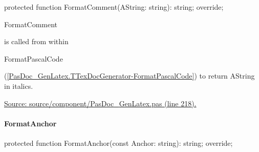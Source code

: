 \documentclass{report}
\newif\ifpdf
\begin{document}
\label{PasDoc_GenLatex.TTexDocGenerator-FormatComment}
\begin{list}{}{
\setlength{\itemindent}{0cm}
\setlength{\listparindent}{0cm}
\setlength{\leftmargin}{\evensidemargin}
\addtolength{\leftmargin}{\tmplength}
\settowidth{\labelsep}{X}
\addtolength{\leftmargin}{\labelsep}
\setlength{\labelwidth}{\tmplength}
}
\item[\textbf{Declaration}\hfill]
\ifpdf
\begin{flushleft}
\fi
\begin{ttfamily}
protected function FormatComment(AString: string): string; override;\end{ttfamily}

\ifpdf
\end{flushleft}
\fi

\par
\item[\textbf{Description}]
\begin{ttfamily}FormatComment\end{ttfamily} is called from within \begin{ttfamily}FormatPascalCode\end{ttfamily}(\ref{PasDoc_GenLatex.TTexDocGenerator-FormatPascalCode}) to return AString in italics.\par
\href{https://github.com/pasdoc/pasdoc/blob/master/source/component/PasDoc_GenLatex.pas#L218}{Source: source/component/PasDoc{\_}GenLatex.pas (line 218).}

\end{list}
\paragraph*{FormatAnchor}\hspace*{\fill}

\label{PasDoc_GenLatex.TTexDocGenerator-FormatAnchor}
\begin{list}{}{
\setlength{\itemindent}{0cm}
\setlength{\listparindent}{0cm}
\setlength{\leftmargin}{\evensidemargin}
\addtolength{\leftmargin}{\tmplength}
\settowidth{\labelsep}{X}
\addtolength{\leftmargin}{\labelsep}
\setlength{\labelwidth}{\tmplength}
}
\item[\textbf{Declaration}\hfill]
\ifpdf
\begin{flushleft}
\fi
\begin{ttfamily}
protected function FormatAnchor(const Anchor: string): string; override;\end{ttfamily}

\ifpdf
\end{flushleft}
\fi

\end{list}
\end{document}
